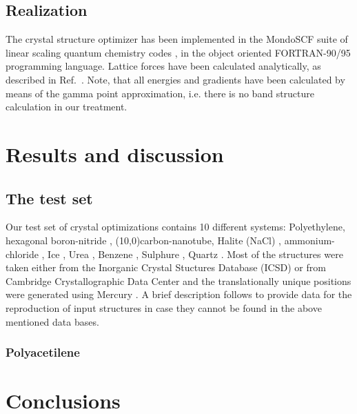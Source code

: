 \documentclass[prl,aps,preprint,superbib,12pt]{revtex4}
\begin{document}
\subsection{Realization}
The crystal structure optimizer has been implemented in the
MondoSCF suite of linear scaling quantum chemistry codes 
\cite{MondoSCF}, in the object oriented 
FORTRAN-90/95 programming language.
Lattice forces have been calculated analytically, as described in 
Ref.~\cite{CJTymczak04LatF}. Note, that all energies and gradients
have been calculated by means of the gamma point approximation,
i.e. there is no band structure calculation in our treatment.

\section{Results and discussion} \label{ResDissc}
\subsection{The test set}
Our test set of crystal optimizations contains
10 different systems:
Polyethylene, hexagonal boron-nitride , (10,0)carbon-nanotube,
Halite (NaCl) \cite{whbragg13}, 
ammonium-chloride \cite{DBSirdeshmukh70},
Ice \cite{AGoto90}, Urea \cite{SSwaminathan84}, 
Benzene \cite{GJeffrey87}, Sulphure \cite{ACGallacher92}, 
Quartz \cite{MGTucker01}.
Most of the structures were
taken either from the Inorganic Crystal Stuctures Database
(ICSD) \cite{ICSD} or from Cambridge Crystallographic Data Center
\cite{CCDC} and the translationally unique positions were
generated using Mercury \cite{Mercury}. 
A brief description follows to provide data for the reproduction
of input structures in case they cannot be found
in the above mentioned data bases. 

\subsubsection{Polyacetilene}

\section{Conclusions} \label{Conclusions}


\end{document}
